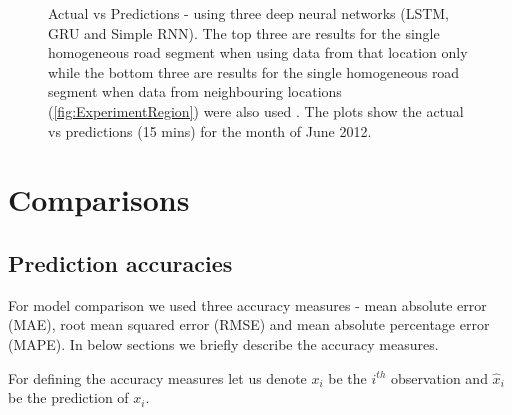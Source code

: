 \begin{figure}[h]
    \qquad

    \caption[Actual vs Predictions, using deep networks]{Actual vs Predictions - using three deep
    neural networks (LSTM, GRU and Simple RNN). The top three are results for the single homogeneous
    road segment when using data from that location only while the bottom three are results for the
    single homogeneous road segment when data from neighbouring locations (\ref{fig:ExperimentRegion})
    were also used . The plots show the actual vs predictions (15 mins) for the month of June 2012.}
    \label{fig:deepNNModels}
\end{figure}

\section{Comparisons}

\subsection{Prediction accuracies}
For model comparison we used three accuracy measures - mean absolute error (MAE), root mean squared
error (RMSE) and mean absolute percentage error (MAPE). In below sections we briefly describe
the accuracy measures.

For defining the accuracy measures let us denote $x_{i}$ be the $i^{th}$ observation and
$\hat{x}_{i}$ be the prediction of $x_{i}$.

